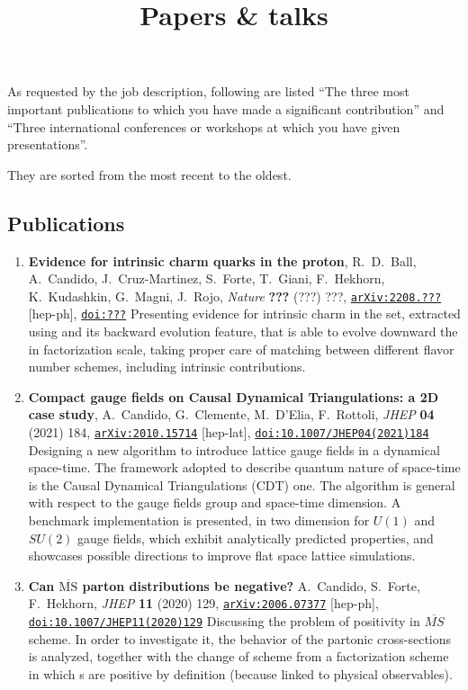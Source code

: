 \documentclass[10pt, a4paper, sans]{moderncv}
\title{Papers \& talks}
\newcommand{\journal}[4]{\textit{#1} \textbf{#2} (#3) #4}
\newcommand{\doi}[1]{\texttt{\href{https://doi.org/#1}{doi:#1}}}
\newcommand{\arxiv}[2]{\texttt{\href{https://arxiv.org/abs/#1}{arXiv:#1}} [#2]}
\begin{document}
\fancyfoot[RF]{}

As requested by the job description, following are listed \enquote{The
three most important publications to which you have made a significant
contribution} and \enquote{Three international conferences or workshops at
which you have given presentations}.

They are sorted from the most recent to the oldest.

\begin{multicols}{2}

\section{Publications}

\begin{enumerate}
    \item \textbf{Evidence for intrinsic charm quarks in the proton},
      R.~D.~Ball, A.~Candido, J.~Cruz-Martinez, S.~Forte, T.~Giani, F.~Hekhorn,
      K.~Kudashkin, G.~Magni, J.~Rojo, 
      \journal{Nature}{???}{???}{???},
      \arxiv{2208.???}{hep-ph},
      \doi{???}
      \newline
      Presenting evidence for intrinsic charm in the  \pdf set,
      extracted using \eko and its backward evolution feature, that is able to
      evolve downward the \pdf in factorization scale, taking proper care of
      matching between different flavor number schemes, including intrinsic
      contributions.
    \item \textbf{Compact gauge fields on Causal Dynamical Triangulations: a 2D
      case study},
      A.~Candido, G.~Clemente, M.~D'Elia, F.~Rottoli,
      \journal{JHEP}{04}{2021}{184},
      \arxiv{2010.15714}{hep-lat},
      \doi{10.1007/JHEP04(2021)184} 
      \newline
      Designing a new algorithm to introduce lattice gauge fields in a
      dynamical space-time. The framework adopted to describe quantum nature of
      space-time is the Causal Dynamical Triangulations ({\small CDT}) one.
      The algorithm is general with respect to the gauge fields group and
      space-time dimension.
      A benchmark implementation is presented, in two dimension for $U(1)$ and
      $SU(2)$ gauge fields, which exhibit analytically predicted properties,
      and showcases possible directions to improve flat space lattice simulations.
    \item \textbf{Can $ \overline{\mathrm{MS}} $ parton distributions be negative?}
      A.~Candido, S.~Forte, F.~Hekhorn,
      \journal{JHEP}{11}{2020}{129},
      \arxiv{2006.07377}{hep-ph},
      \doi{10.1007/JHEP11(2020)129}
      \newline
      Discussing the problem of \pdf positivity in $\overline{MS}$ scheme. In
      order to investigate it, the behavior of the partonic cross-sections is
      analyzed, together with the change of scheme from a factorization scheme
      in which \pdf{}s are positive by definition (because linked to physical
      observables).
\end{enumerate}


\end{multicols}
\end{document}
